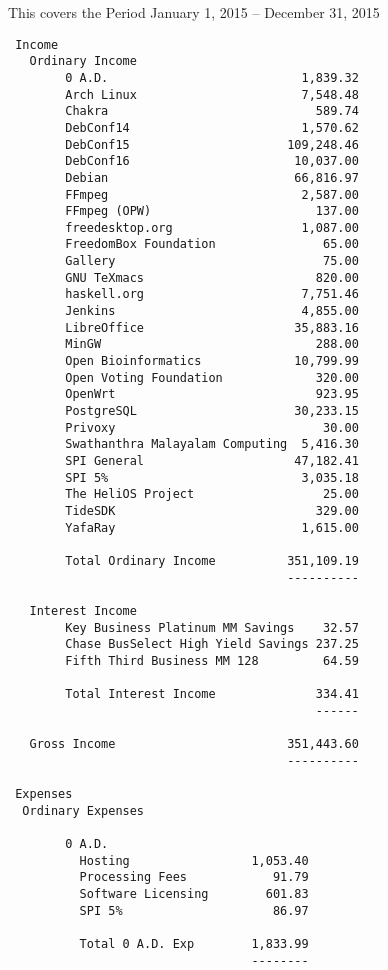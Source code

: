 \documentclass[letterpaper]{report}
\begin{document}
This covers the Period January 1, 2015 -- December 31, 2015

\begin{verbatim}
 Income
   Ordinary Income
        0 A.D.                           1,839.32
        Arch Linux                       7,548.48
        Chakra                             589.74
        DebConf14                        1,570.62
        DebConf15                      109,248.46
        DebConf16                       10,037.00
        Debian                          66,816.97
        FFmpeg                           2,587.00
        FFmpeg (OPW)                       137.00
        freedesktop.org                  1,087.00
        FreedomBox Foundation               65.00
        Gallery                             75.00
        GNU TeXmacs                        820.00
        haskell.org                      7,751.46
        Jenkins                          4,855.00
        LibreOffice                     35,883.16
        MinGW                              288.00
        Open Bioinformatics             10,799.99
        Open Voting Foundation             320.00
        OpenWrt                            923.95
        PostgreSQL                      30,233.15
        Privoxy                             30.00
        Swathanthra Malayalam Computing  5,416.30
        SPI General                     47,182.41
        SPI 5%                           3,035.18
        The HeliOS Project                  25.00
        TideSDK                            329.00
        YafaRay                          1,615.00

        Total Ordinary Income          351,109.19
                                       ----------

   Interest Income
        Key Business Platinum MM Savings    32.57
        Chase BusSelect High Yield Savings 237.25
        Fifth Third Business MM 128         64.59

        Total Interest Income              334.41
                                           ------

   Gross Income                        351,443.60
                                       ----------

 Expenses
  Ordinary Expenses

        0 A.D.
          Hosting                 1,053.40
          Processing Fees            91.79
          Software Licensing        601.83
          SPI 5%                     86.97

          Total 0 A.D. Exp        1,833.99
                                  --------


\end{verbatim}
\end{document}
